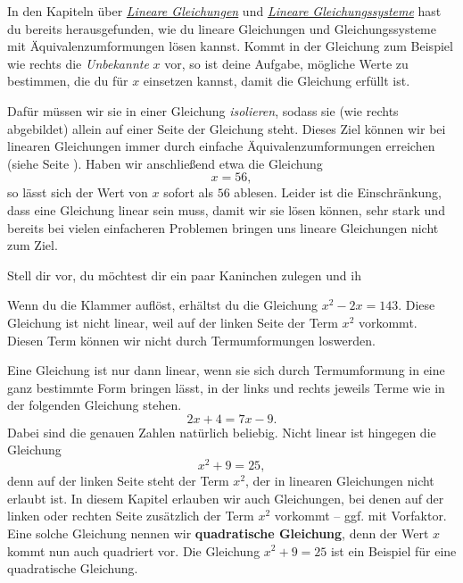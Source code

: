 \documentclass[../../main.tex]{subfiles}
\begin{document}
In den Kapiteln über \hyperlink{chap:lineare_gleichungen}{\emph{Lineare Gleichungen}} und \hyperlink{chap:lgs}{\emph{Lineare Gleichungssysteme}} 
hast du bereits herausgefunden, wie du lineare Gleichungen und Gleichungssysteme mit
Äquivalenzumformungen lösen kannst. Kommt in der Gleichung zum Beispiel wie rechts die \emph{Unbekannte} $x$ vor, 
so ist deine Aufgabe, mögliche Werte zu bestimmen, die du für $x$ einsetzen kannst, damit die Gleichung erfüllt ist.

Dafür müssen wir sie in einer Gleichung \emph{isolieren}, sodass sie (wie rechts abgebildet) allein auf einer Seite der 
Gleichung steht. Dieses Ziel können wir bei 
linearen Gleichungen immer durch einfache Äquivalenzumformungen erreichen (siehe Seite 
\pageref{lineare-gleichungen-loesungsverfahren}). Haben wir anschließend etwa die Gleichung
\[x=56,\]
so lässt sich der Wert von $x$ sofort als $56$ ablesen. Leider ist die Einschränkung, dass eine Gleichung linear
sein muss, damit wir sie lösen können, sehr stark und bereits bei vielen einfacheren Problemen bringen uns lineare
Gleichungen nicht zum Ziel.
\begin{example}{}
    Stell dir vor, du möchtest dir ein paar Kaninchen zulegen und ih

    Wenn du die Klammer auflöst, erhältst du die Gleichung $x^2-2x=143$. Diese Gleichung ist nicht linear, weil auf
    der linken Seite der Term $x^2$ vorkommt. Diesen Term können wir nicht durch Termumformungen loswerden.
\end{example}
Eine Gleichung ist nur dann linear, wenn sie sich durch Termumformung in eine ganz bestimmte Form bringen lässt, in der
links und rechts jeweils Terme wie in der folgenden Gleichung stehen.
\[2x+4=7x-9.\]
Dabei sind die genauen Zahlen natürlich beliebig. Nicht linear ist hingegen die Gleichung
\[x^2+9=25,\]
denn auf der linken Seite steht der Term $x^2$, der in linearen Gleichungen nicht erlaubt ist. In diesem Kapitel 
erlauben wir auch Gleichungen, bei denen auf der linken oder rechten Seite zusätzlich der Term $x^2$ vorkommt -- ggf. 
mit Vorfaktor. Eine solche Gleichung nennen wir
\textbf{quadratische Gleichung}, denn der Wert $x$ kommt nun auch quadriert vor. Die Gleichung $x^2+9=25$ ist ein 
Beispiel für eine quadratische Gleichung.
\end{document}

